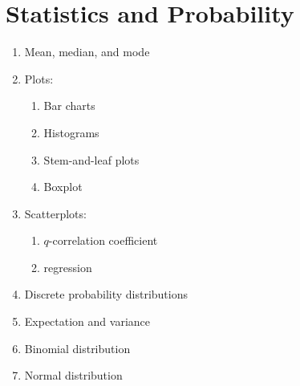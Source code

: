 
\chapter{Statistics and Probability}

\begin{enumerate}
\item Mean, median, and mode

\item Plots:
  \begin{enumerate}
  \item Bar charts

  \item Histograms

  \item Stem-and-leaf plots

  \item Boxplot
  \end{enumerate}

\item Scatterplots:
  \begin{enumerate}
  \item $q$-correlation coefficient

  \item regression
  \end{enumerate}

\item Discrete probability distributions

\item Expectation and variance

\item Binomial distribution

\item Normal distribution
\end{enumerate}
